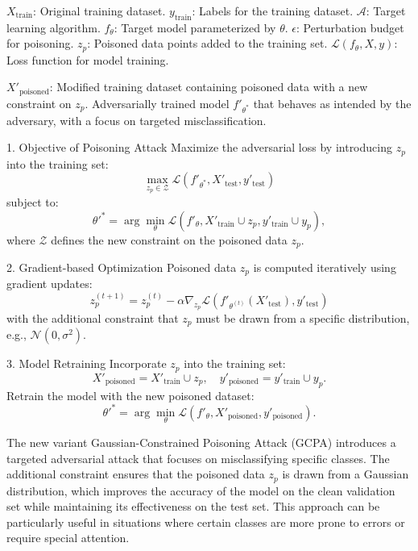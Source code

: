 $X_{\text{train}}$: Original training dataset.
$y_{\text{train}}$: Labels for the training dataset.
$\mathcal{A}$: Target learning algorithm.
$f_{\theta}$: Target model parameterized by $\theta$.
$\epsilon$: Perturbation budget for poisoning.
$z_p$: Poisoned data points added to the training set.
$\mathcal{L}(f_{\theta}, X, y)$: Loss function for model training.

$X'_{\text{poisoned}}$: Modified training dataset containing poisoned data with a new constraint on $z_p$.
Adversarially trained model $f'_{\theta^{\ast}}$ that behaves as intended by the adversary, with a focus on targeted misclassification.

1. Objective of Poisoning Attack
Maximize the adversarial loss by introducing $z_p$ into the training set:
\[
\max_{z_p \in \mathcal{Z}} \mathcal{L}(f'_{\theta^{\ast}}, X'_{\text{test}}, y'_{\text{test}})
\]
subject to:
\[
\theta'^{\ast} = \arg \min_{\theta} \mathcal{L}(f'_{\theta}, X'_{\text{train}} \cup z_p, y'_{\text{train}} \cup y_p),
\]
where $\mathcal{Z}$ defines the new constraint on the poisoned data $z_p$.

2. Gradient-based Optimization
Poisoned data $z_p$ is computed iteratively using gradient updates:
\[
z_p^{(t+1)} = z_p^{(t)} - \alpha \nabla_{z_p} \mathcal{L}(f'_{\theta^{(t)}}(X'_{\text{test}}), y'_{\text{test}})
\]
with the additional constraint that $z_p$ must be drawn from a specific distribution, e.g., $\mathcal{N}(0, \sigma^2)$.

3. Model Retraining
Incorporate $z_p$ into the training set:
\[
X'_{\text{poisoned}} = X'_{\text{train}} \cup z_p, \quad y'_{\text{poisoned}} = y'_{\text{train}} \cup y_p.
\]
Retrain the model with the new poisoned dataset:
\[
\theta'^{\ast} = \arg \min_{\theta} \mathcal{L}(f'_{\theta}, X'_{\text{poisoned}}, y'_{\text{poisoned}}).
\]

The new variant Gaussian-Constrained Poisoning Attack (GCPA) introduces a targeted adversarial attack that focuses on misclassifying specific classes. The additional constraint ensures that the poisoned data $z_p$ is drawn from a Gaussian distribution, which improves the accuracy of the model on the clean validation set while maintaining its effectiveness on the test set. This approach can be particularly useful in situations where certain classes are more prone to errors or require special attention.
